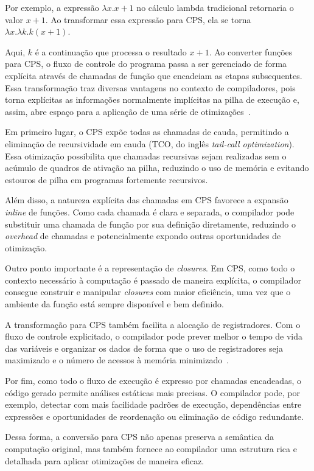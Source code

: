 Por exemplo, a expressão $\lambda x. x + 1$ no cálculo lambda tradicional retornaria o valor $x + 1$. Ao transformar essa expressão para CPS, ela se torna $\lambda x. \lambda k. k (x + 1)$.

Aqui, $k$ é a continuação que processa o resultado $x + 1$.
Ao converter funções para CPS, o fluxo de controle do programa passa a ser gerenciado de forma explícita através de chamadas de função que encadeiam as etapas subsequentes.
Essa transformação traz diversas vantagens no contexto de compiladores, pois torna explícitas as informações normalmente implícitas na pilha de execução e, assim, abre espaço para a aplicação de uma série de otimizações~\cite{appel1992compiling}.  

Em primeiro lugar, o CPS expõe todas as chamadas de cauda, permitindo a eliminação de recursividade em cauda (TCO, do inglês \textit{tail-call optimization}).
Essa otimização possibilita que chamadas recursivas sejam realizadas sem o acúmulo de quadros de ativação na pilha, reduzindo o uso de memória e evitando estouros de pilha em programas fortemente recursivos.

Além disso, a natureza explícita das chamadas em CPS favorece a expansão \textit{inline} de funções.
Como cada chamada é clara e separada, o compilador pode substituir uma chamada de função por sua definição diretamente, reduzindo o \textit{overhead} de chamadas e potencialmente expondo outras oportunidades de otimização.

Outro ponto importante é a representação de \textit{closures}.
Em CPS, como todo o contexto necessário à computação é passado de maneira explícita, o compilador consegue construir e manipular \textit{closures} com maior eficiência, uma vez que o ambiente da função está sempre disponível e bem definido.

A transformação para CPS também facilita a alocação de registradores.
Com o fluxo de controle explicitado, o compilador pode prever melhor o tempo de vida das variáveis e organizar os dados de forma que o uso de registradores seja maximizado e o número de acessos à memória minimizado~\cite{appel1992compiling}.

Por fim, como todo o fluxo de execução é expresso por chamadas encadeadas, o código gerado permite análises estáticas mais precisas.
O compilador pode, por exemplo, detectar com mais facilidade padrões de execução, dependências entre expressões e oportunidades de reordenação ou eliminação de código redundante.

Dessa forma, a conversão para CPS não apenas preserva a semântica da computação original, mas também fornece ao compilador uma estrutura rica e detalhada para aplicar otimizações de maneira eficaz.

